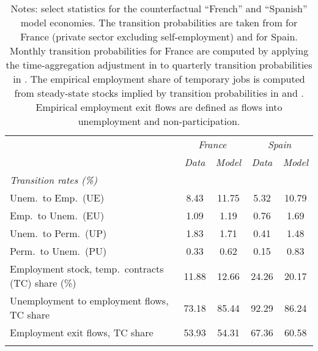 \begin{table}[!h]
	\centering
	\label{tab:outcomes}
	\begin{tabular}{l c c c c}
		\hline \hline
		\addlinespace
		\hspace{100pt} & \multicolumn{2}{c}{\textit{France}} & \multicolumn{2}{c}{\textit{Spain}} \\ 
		                & \textit{Data} & \textit{Model} & \textit{Data} & \textit{Model} \\ 
		\addlinespace
		\addlinespace
		\addlinespace
		\addlinespace
		\textit{Transition rates (\%)} \\ 
		\hspace{5pt} Unem.\ to Emp.\ (UE) & 8.43 & 11.75 & 5.32 & 10.79 \\ 
		\hspace{5pt} Emp.\ to Unem.\ (EU) & 1.09 & 1.19 & 0.76 & 1.69 \\ 
		\hspace{5pt} Unem.\ to Perm.\ (UP) & 1.83 & 1.71 & 0.41 & 1.48 \\ 
		\hspace{5pt} Perm.\ to Unem.\ (PU) & 0.33 & 0.62 & 0.15 & 0.83 \\ 
		\addlinespace
		Employment stock, temp.\ contracts (TC) share (\%)  \hspace{20pt} & 11.88 & 12.66 & 24.26 & 20.17 \\ 
		Unemployment to employment flows, TC share & 73.18 & 85.44 & 92.29 & 86.24 \\ 
		Employment exit flows, TC share & 53.93 & 54.31 & 67.36 & 60.58 \\ 
		\addlinespace
		\addlinespace
		\hline \hline
	\end{tabular}
 \caption*{\footnotesize Notes: select statistics for the counterfactual ``French'' and ``Spanish'' model economies. The transition  probabilities are taken from \cite{gw2015} for France (private sector excluding self-employment) and \cite{Silva_Vazquez_Grenno:2013:LabourEcon} for Spain. Monthly transition probabilities for France are computed by applying the time-aggregation adjustment in \cite{shimer:2012:RED} to quarterly transition probabilities in \cite{gw2015}. The empirical employment share of temporary jobs is computed from steady-state stocks implied by transition probabilities in \cite{gw2015} and \cite{Silva_Vazquez_Grenno:2013:LabourEcon}. Empirical employment exit flows are defined as flows into unemployment and non-participation.}\end{table}
